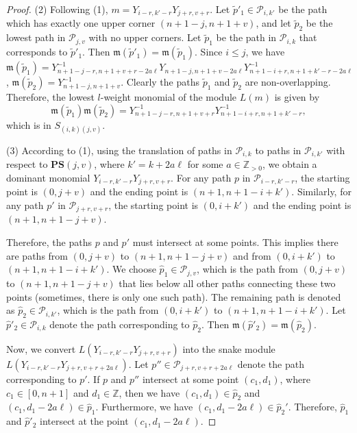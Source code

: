 \documentclass[12pt, reqno]{amsart}
\numberwithin{equation}{section}
\newcommand{\ZZ}{\mathbb{Z}}
\begin{document}
{\begin{proof}
(2) Following (1), $m=Y_{i-r,k'-r}Y_{j+r,v+r}$. Let $\widetilde{p}'_1 \in\mathscr{P}_{i,k'}$ be the path which has exactly one upper corner $(n+1-j, n+1+v)$, and let $\widetilde{p}_2$ be the lowest path in $\mathscr{P}_{j,v}$ with no upper corners. Let $\widetilde{p}_1$ be the path in $\mathscr{P}_{i,k}$ that corresponds to $\widetilde{p}'_1$. Then $\mathfrak{m}(\widetilde{p}'_1)=\mathfrak{m}(\widetilde{p}_1)$. Since $i\leq j$, we have $\mathfrak{m}(\widetilde{p}_1)=Y_{n+1-j-r,n+1+v+r-2a \ell}^{-1}Y_{n+1-j,n+1+v-2a \ell}Y_{n+1-i+r,n+1+k'-r-2a \ell}^{-1}$, $\mathfrak{m}(\widetilde{p}_2)=Y_{n+1-j,n+1+v}^{-1}$. Clearly the paths $\widetilde{p}_1$ and $\widetilde{p}_2$ are non-overlapping. Therefore, the lowest $l$-weight monomial of the module $L(m)$ is given by
\[
 \mathfrak{m}(\widetilde{p}_1)\mathfrak{m}(\widetilde{p}_2)=Y_{n+1-j-r,n+1+v+r}^{-1}Y_{n+1-i+r,n+1+k'-r}^{-1}, 
 \]
which is in $S_{(i,k)(j,v)}$.


(3) According to (1), using the translation of paths in $\mathscr{P}_{i,k}$ to paths in $\mathscr{P}_{i,k'}$ with respect to $\mathbf{PS}(j,v)$, where $k'=k+2a \ell$ for some $a\in\ZZ_{>0}$, we obtain a dominant monomial $Y_{i-r,k'-r}Y_{j+r,v+r}$. For any path $p$ in $\mathscr{P}_{i-r,k'-r}$, the starting point is $(0,j+v)$ and the ending point is $(n+1,n+1-i+k')$. Similarly, for any path $p'$ in $\mathscr{P}_{j+r,v+r}$, the starting point is $(0,i+k')$ and the ending point is $(n+1,n+1-j+v)$.

Therefore, the paths $p$ and $p'$ must intersect at some points. This implies there are paths from $(0,j+v)$ to $(n+1,n+1-j+v)$ and from $(0,i+k')$ to $(n+1,n+1-i+k')$. We choose $\hat{p}_1\in \mathscr{P}_{j,v}$, which is the path from $(0,j+v)$ to $(n+1,n+1-j+v)$ that lies below all other paths connecting these two points (sometimes, there is only one such path). The remaining path is denoted as $\hat{p}_2\in\mathscr{P}_{i,k'}$, which is the path from $(0,i+k')$ to $(n+1,n+1-i+k')$. Let $\hat{p}'_2\in\mathscr{P}_{i,k}$ denote the path corresponding to $\hat{p}_2$. Then $\mathfrak{m}(\hat{p}'_2)=\mathfrak{m}(\hat{p}_2)$.


Now, we convert $L(Y_{i-r,k'-r}Y_{j+r,v+r})$ into the snake module $L(Y_{i-r,k'-r}Y_{j+r,v+r+2a \ell})$. Let $p''\in\mathscr{P}_{j+r,v+r+2a \ell}$ denote the path corresponding to $p'$. If $p$ and $p''$ intersect at some point $(c_1,d_1)$, where $c_1\in [0,n+1]$ and $d_1\in \ZZ$, then we have $(c_1,d_1)\in \hat{p}_2$ and $(c_1,d_1-2a \ell) \in \hat{p}_1$. Furthermore, we have $(c_1,d_1-2a \ell)\in \hat{p}_2'$. Therefore, $\hat{p}_1$ and $\hat{p}'_2$ intersect at the point $(c_1,d_1-2a\ell)$.


\end{proof}}
\end{document}
